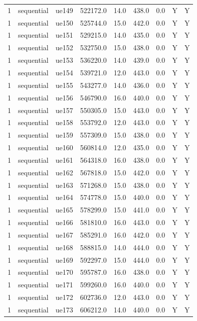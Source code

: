 \begin{table}[ht]
\begin{tabular}{|c|c|c|c|c|c|c|c|c|}
1 & sequential & ue149 & 522172.0 & 14.0 & 438.0 & 0.0 & Y & Y \\
1 & sequential & ue150 & 525744.0 & 15.0 & 442.0 & 0.0 & Y & Y \\
1 & sequential & ue151 & 529215.0 & 14.0 & 435.0 & 0.0 & Y & Y \\
1 & sequential & ue152 & 532750.0 & 15.0 & 438.0 & 0.0 & Y & Y \\
1 & sequential & ue153 & 536220.0 & 14.0 & 439.0 & 0.0 & Y & Y \\
1 & sequential & ue154 & 539721.0 & 12.0 & 443.0 & 0.0 & Y & Y \\
1 & sequential & ue155 & 543277.0 & 14.0 & 436.0 & 0.0 & Y & Y \\
1 & sequential & ue156 & 546790.0 & 16.0 & 440.0 & 0.0 & Y & Y \\
1 & sequential & ue157 & 550305.0 & 15.0 & 443.0 & 0.0 & Y & Y \\
1 & sequential & ue158 & 553792.0 & 12.0 & 443.0 & 0.0 & Y & Y \\
1 & sequential & ue159 & 557309.0 & 15.0 & 438.0 & 0.0 & Y & Y \\
1 & sequential & ue160 & 560814.0 & 12.0 & 435.0 & 0.0 & Y & Y \\
1 & sequential & ue161 & 564318.0 & 16.0 & 438.0 & 0.0 & Y & Y \\
1 & sequential & ue162 & 567818.0 & 15.0 & 442.0 & 0.0 & Y & Y \\
1 & sequential & ue163 & 571268.0 & 15.0 & 438.0 & 0.0 & Y & Y \\
1 & sequential & ue164 & 574778.0 & 15.0 & 440.0 & 0.0 & Y & Y \\
1 & sequential & ue165 & 578299.0 & 15.0 & 441.0 & 0.0 & Y & Y \\
1 & sequential & ue166 & 581810.0 & 16.0 & 443.0 & 0.0 & Y & Y \\
1 & sequential & ue167 & 585291.0 & 16.0 & 442.0 & 0.0 & Y & Y \\
1 & sequential & ue168 & 588815.0 & 14.0 & 444.0 & 0.0 & Y & Y \\
1 & sequential & ue169 & 592297.0 & 15.0 & 444.0 & 0.0 & Y & Y \\
1 & sequential & ue170 & 595787.0 & 16.0 & 438.0 & 0.0 & Y & Y \\
1 & sequential & ue171 & 599260.0 & 16.0 & 440.0 & 0.0 & Y & Y \\
1 & sequential & ue172 & 602736.0 & 12.0 & 443.0 & 0.0 & Y & Y \\
1 & sequential & ue173 & 606212.0 & 14.0 & 440.0 & 0.0 & Y & Y \\

\end{tabular}
\end{table}
